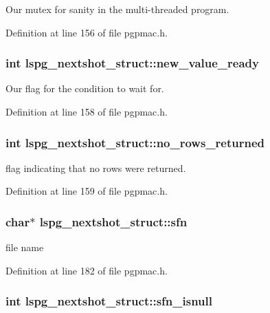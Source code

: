 Our mutex for sanity in the multi-\/threaded program. 

Definition at line 156 of file pgpmac.h.\hypertarget{structlspg__nextshot__struct_adb8da14444b98f556dba9420dd4666dc}{
\subsubsection[{new\_\-value\_\-ready}]{\setlength{\rightskip}{0pt plus 5cm}int {\bf lspg\_\-nextshot\_\-struct::new\_\-value\_\-ready}}}
\label{structlspg__nextshot__struct_adb8da14444b98f556dba9420dd4666dc}


Our flag for the condition to wait for. 

Definition at line 158 of file pgpmac.h.\hypertarget{structlspg__nextshot__struct_abc9242805729f70b83df79706c394c71}{
\subsubsection[{no\_\-rows\_\-returned}]{\setlength{\rightskip}{0pt plus 5cm}int {\bf lspg\_\-nextshot\_\-struct::no\_\-rows\_\-returned}}}
\label{structlspg__nextshot__struct_abc9242805729f70b83df79706c394c71}


flag indicating that no rows were returned. 

Definition at line 159 of file pgpmac.h.\hypertarget{structlspg__nextshot__struct_a03252bba597b081edc9d08b20b558cc7}{
\subsubsection[{sfn}]{\setlength{\rightskip}{0pt plus 5cm}char$\ast$ {\bf lspg\_\-nextshot\_\-struct::sfn}}}
\label{structlspg__nextshot__struct_a03252bba597b081edc9d08b20b558cc7}


file name 

Definition at line 182 of file pgpmac.h.\hypertarget{structlspg__nextshot__struct_a56f32eb413b1fca9f085874eb86294de}{
\subsubsection[{sfn\_\-isnull}]{\setlength{\rightskip}{0pt plus 5cm}int {\bf lspg\_\-nextshot\_\-struct::sfn\_\-isnull}}}
\label{structlspg__nextshot__struct_a56f32eb413b1fca9f085874eb86294de}


